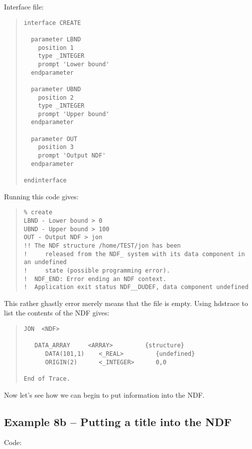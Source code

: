 Interface file:

\begin{quote}
{\small
\begin{verbatim}
interface CREATE

  parameter LBND
    position 1
    type _INTEGER
    prompt 'Lower bound'
  endparameter

  parameter UBND
    position 2
    type _INTEGER
    prompt 'Upper bound'
  endparameter

  parameter OUT
    position 3
    prompt 'Output NDF'
  endparameter

endinterface
\end{verbatim}
}
\end{quote}

Running this code gives:

\begin{quote}
{\small
\begin{verbatim}
% create
LBND - Lower bound > 0
UBND - Upper bound > 100
OUT - Output NDF > jon
!! The NDF structure /home/TEST/jon has been
!     released from the NDF_ system with its data component in an undefined
!     state (possible programming error).
!  NDF_END: Error ending an NDF context.
!  Application exit status NDF__DUDEF, data component undefined
\end{verbatim}
}
\end{quote}

This rather ghastly error merely means that the file is empty. Using {\sf
hdstrace} to list the contents of the NDF gives:

\begin{quote}
{\small
\begin{verbatim}
JON  <NDF>

   DATA_ARRAY     <ARRAY>         {structure}
      DATA(101,1)    <_REAL>         {undefined}
      ORIGIN(2)      <_INTEGER>      0,0

End of Trace.
\end{verbatim}
}
\end{quote}

Now let's see how we can begin to put information into the NDF.

\subsection{Example 8b -- Putting a title into the NDF}

Code:

